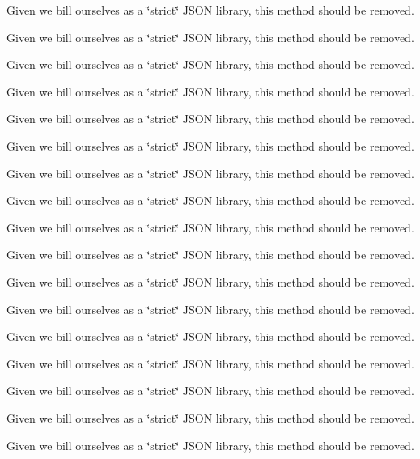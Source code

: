 \begin{DoxyRefList}
\-Given we bill ourselves as a \char`\"{}strict\char`\"{} \-J\-S\-O\-N library, this method should be removed. 

\-Given we bill ourselves as a \char`\"{}strict\char`\"{} \-J\-S\-O\-N library, this method should be removed. 

\-Given we bill ourselves as a \char`\"{}strict\char`\"{} \-J\-S\-O\-N library, this method should be removed. 

\-Given we bill ourselves as a \char`\"{}strict\char`\"{} \-J\-S\-O\-N library, this method should be removed. 

\-Given we bill ourselves as a \char`\"{}strict\char`\"{} \-J\-S\-O\-N library, this method should be removed.  
\item[\label{deprecated__deprecated000008}%
\hypertarget{deprecated__deprecated000008}{}%
\-Member \hyperlink{interface_s_b_j_s_o_n_a9289d1d536954874498df4143c55ee80}{\mbox{[}\-S\-B\-J\-S\-O\-N string\-With\-Fragment\-:error\-:\mbox{]}} ]\-Given we bill ourselves as a \char`\"{}strict\char`\"{} \-J\-S\-O\-N library, this method should be removed. 

\-Given we bill ourselves as a \char`\"{}strict\char`\"{} \-J\-S\-O\-N library, this method should be removed. 

\-Given we bill ourselves as a \char`\"{}strict\char`\"{} \-J\-S\-O\-N library, this method should be removed. 

\-Given we bill ourselves as a \char`\"{}strict\char`\"{} \-J\-S\-O\-N library, this method should be removed. 

\-Given we bill ourselves as a \char`\"{}strict\char`\"{} \-J\-S\-O\-N library, this method should be removed. 

\-Given we bill ourselves as a \char`\"{}strict\char`\"{} \-J\-S\-O\-N library, this method should be removed.  
\item[\label{deprecated__deprecated000007}%
\hypertarget{deprecated__deprecated000007}{}%
\-Member \hyperlink{interface_s_b_j_s_o_n_adfe4a880ee09edf0c9d14508d79311d8}{\mbox{[}\-S\-B\-J\-S\-O\-N string\-With\-Object\-:allow\-Scalar\-:error\-:\mbox{]}} ]\-Given we bill ourselves as a \char`\"{}strict\char`\"{} \-J\-S\-O\-N library, this method should be removed. 

\-Given we bill ourselves as a \char`\"{}strict\char`\"{} \-J\-S\-O\-N library, this method should be removed. 

\-Given we bill ourselves as a \char`\"{}strict\char`\"{} \-J\-S\-O\-N library, this method should be removed. 

\-Given we bill ourselves as a \char`\"{}strict\char`\"{} \-J\-S\-O\-N library, this method should be removed. 

\-Given we bill ourselves as a \char`\"{}strict\char`\"{} \-J\-S\-O\-N library, this method should be removed. 

\-Given we bill ourselves as a \char`\"{}strict\char`\"{} \-J\-S\-O\-N library, this method should be removed. 
\end{DoxyRefList}